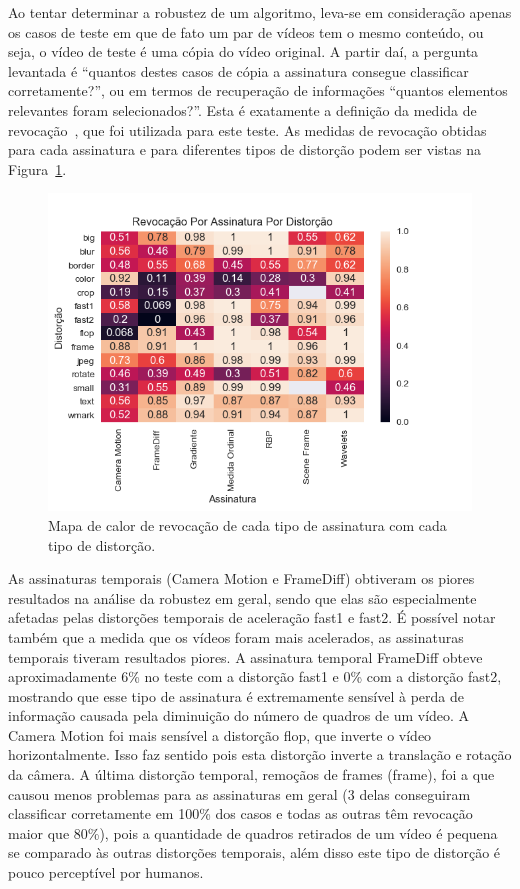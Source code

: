 Ao tentar determinar a robustez de um algoritmo, leva-se em consideração apenas os casos de teste em que de fato um par de vídeos tem o mesmo conteúdo, ou seja, o vídeo de teste é uma cópia do vídeo original. A partir daí, a pergunta levantada é ``quantos destes casos de cópia a assinatura consegue classificar corretamente?'', ou em termos de recuperação de informações ``quantos elementos relevantes foram selecionados?''. Esta é exatamente a definição da medida de revocação~\cite{Ting2010}, que foi utilizada para este teste. As medidas de revocação obtidas para cada assinatura e para diferentes tipos de distorção podem ser vistas na Figura~\ref{fig:heatmap-revocacao}.


\begin{figure}[h]
	\centering
	\caption{Mapa de calor de revocação de cada tipo de assinatura com cada tipo de distorção.}
	\label{fig:heatmap-revocacao}
	\includegraphics[width=\textwidth]{dados/figuras/experimentos/heatmap_final_recall.png}	
\end{figure}

As assinaturas temporais (Camera Motion e FrameDiff) obtiveram os piores resultados na análise da robustez em geral, sendo que elas são especialmente afetadas pelas distorções temporais de aceleração fast1 e fast2. É possível notar também que a medida que os vídeos foram mais acelerados, as assinaturas temporais tiveram resultados piores. A assinatura temporal FrameDiff obteve aproximadamente 6\% no teste com a distorção fast1 e 0\% com a distorção fast2, mostrando que esse tipo de assinatura é extremamente sensível à perda de informação causada pela diminuição do número de quadros de um vídeo. A Camera Motion foi mais sensível a distorção flop, que inverte o vídeo horizontalmente. Isso faz sentido pois esta distorção inverte a translação e rotação da câmera. A última distorção temporal, remoçãos de frames (frame), foi a que causou menos problemas para as assinaturas em geral (3 delas conseguiram classificar corretamente em 100\% dos casos e todas as outras têm revocação maior que 80\%), pois a quantidade de quadros retirados de um vídeo é pequena se comparado às outras distorções temporais, além disso este tipo de distorção é pouco perceptível por humanos.

